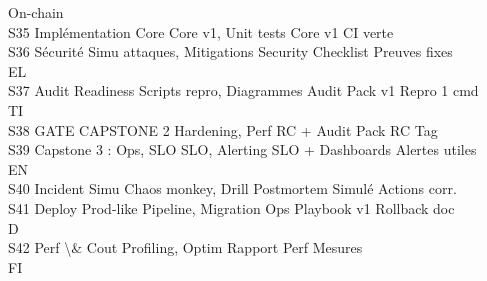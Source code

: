 \documentclass[12pt,landscape,a4paper]{article}
\begin{document}
On-chain\\
S35 Implémentation Core                  Core v1, Unit tests              Core v1                  CI verte\\
S36 Sécurité                             Simu attaques, Mitigations       Security Checklist       Preuves fixes\\
\vspace{0.5em}
\vspace{0.5em}
\vspace{0.5em}
\vspace{0.5em}
EL\\
S37 Audit Readiness                      Scripts repro, Diagrammes        Audit Pack v1            Repro 1 cmd\\
\vspace{0.5em}
\vspace{0.5em}
\vspace{0.5em}
\vspace{0.5em}
TI\\
S38 GATE CAPSTONE 2                      Hardening, Perf                  RC + Audit Pack          RC Tag\\
S39 Capstone 3 : Ops, SLO                SLO, Alerting                    SLO + Dashboards         Alertes utiles\\
\vspace{0.5em}
\vspace{0.5em}
\vspace{0.5em}
\vspace{0.5em}
EN\\
S40 Incident Simu                        Chaos monkey, Drill              Postmortem Simulé        Actions corr.\\
S41 Deploy Prod-like                     Pipeline, Migration              Ops Playbook v1          Rollback doc\\
\vspace{0.5em}
\vspace{0.5em}
\vspace{0.5em}
\vspace{0.5em}
D\\
S42 Perf \textbackslash{}& Cout                          Profiling, Optim                 Rapport Perf             Mesures\\
\vspace{0.5em}
\vspace{0.5em}
\vspace{0.5em}
\vspace{0.5em}
FI\\
\end{document}
